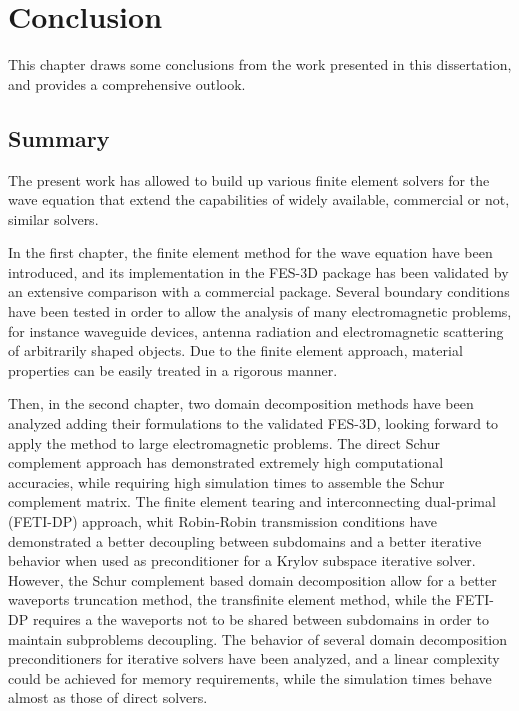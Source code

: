 \chapter{Conclusion} \label{chap:CC}

This chapter draws some conclusions from the work presented in this dissertation, and provides a comprehensive outlook.

\section{Summary}

The present work has allowed to build up various finite element solvers for the wave equation that extend the capabilities of widely available, commercial or not, similar solvers.

In the first chapter, the finite element method for the wave equation have been introduced, and its implementation in the FES-3D package has been validated by an extensive comparison with a commercial package. Several boundary conditions have been tested in order to allow the analysis of many electromagnetic problems, for instance waveguide devices, antenna radiation and electromagnetic scattering of arbitrarily shaped objects. Due to the finite element approach, material properties can be easily treated in a rigorous manner.

Then, in the second chapter, two domain decomposition methods have been analyzed adding their formulations to the validated FES-3D, looking forward to apply the method to large electromagnetic problems. The direct Schur complement approach has demonstrated extremely high computational accuracies, while requiring high simulation times to assemble the Schur complement matrix. The finite element tearing and interconnecting dual-primal (FETI-DP) approach, whit Robin-Robin transmission conditions have demonstrated a better decoupling between subdomains and a better iterative behavior when used as preconditioner for a Krylov subspace iterative solver. However, the Schur complement based domain decomposition allow for a better waveports truncation method, the transfinite element method, while the FETI-DP requires a the waveports not to be shared between subdomains in order to maintain subproblems decoupling. The behavior of several domain decomposition preconditioners for iterative solvers have been analyzed, and a linear complexity could be achieved for memory requirements, while the simulation times behave almost as those of direct solvers.

